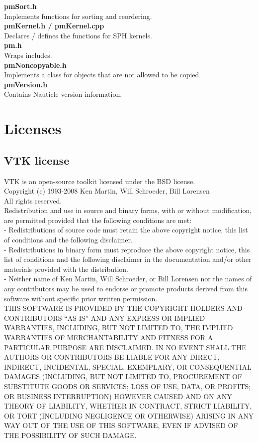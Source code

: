 \documentclass[a4paper,12pt,openany]{book}
\theoremstyle{break}
\begin{document}
\textbf{pmSort.h}\\
Implements functions for sorting and reordering.\\

\textbf{pmKernel.h / pmKernel.cpp} \\
Declares / defines the functions for SPH kernels.\\

\textbf{pm.h}\\
Wraps includes.\\

\textbf{pmNoncopyable.h}\\
Implements a class for objects that are not allowed to be copied.\\

\textbf{pmVersion.h}\\
Contains Nauticle version information.\\




\section{Licenses}
\subsection{VTK license}
VTK is an open-source toolkit licensed under the BSD license.\\
Copyright (c) 1993-2008 Ken Martin, Will Schroeder, Bill Lorensen \\
All rights reserved.\\
Redistribution and use in source and binary forms, with or without modification, are permitted provided that the following conditions are met: \\
- Redistributions of source code must retain the above copyright notice, this list of conditions and the following disclaimer. \\
- Redistributions in binary form must reproduce the above copyright notice, this list of conditions and the following disclaimer in the documentation and/or other materials provided with the distribution. \\
- Neither name of Ken Martin, Will Schroeder, or Bill Lorensen nor the names of any contributors may be used to endorse or promote products derived from this software without specific prior written permission.\\

THIS SOFTWARE IS PROVIDED BY THE COPYRIGHT HOLDERS AND CONTRIBUTORS “AS IS” AND ANY EXPRESS OR IMPLIED WARRANTIES, INCLUDING, BUT NOT LIMITED TO, THE IMPLIED WARRANTIES OF MERCHANTABILITY AND FITNESS FOR A PARTICULAR PURPOSE ARE DISCLAIMED. IN NO EVENT SHALL THE AUTHORS OR CONTRIBUTORS BE LIABLE FOR ANY DIRECT, INDIRECT, INCIDENTAL, SPECIAL, EXEMPLARY, OR CONSEQUENTIAL DAMAGES (INCLUDING, BUT NOT LIMITED TO, PROCUREMENT OF SUBSTITUTE GOODS OR SERVICES; LOSS OF USE, DATA, OR PROFITS; OR BUSINESS INTERRUPTION) HOWEVER CAUSED AND ON ANY THEORY OF LIABILITY, WHETHER IN CONTRACT, STRICT LIABILITY, OR TORT (INCLUDING NEGLIGENCE OR OTHERWISE) ARISING IN ANY WAY OUT OF THE USE OF THIS SOFTWARE, EVEN IF ADVISED OF THE POSSIBILITY OF SUCH DAMAGE.
\end{document}
